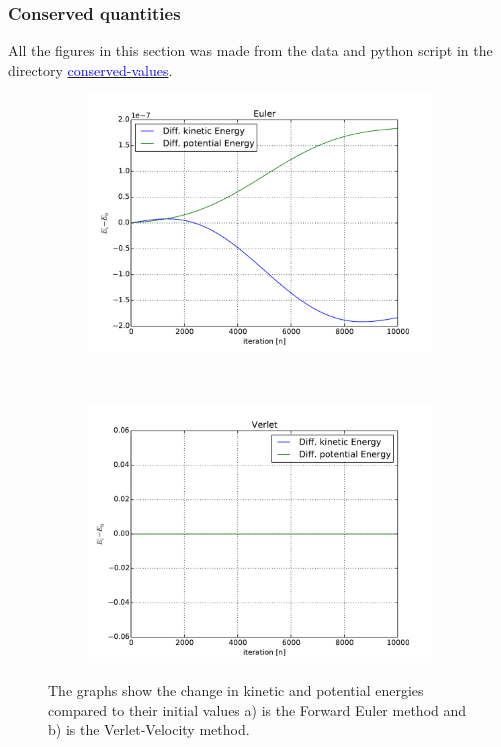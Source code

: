 \subsubsection{Conserved quantities}

All the figures in this section was made from the data and python script in the directory \href{https://github.com/erikfsk/Project-3/tree/master/Project3/conserved-values}{\textcolor{blue}{conserved-values}}.

\begin{figure}[H]
    \centering
    \begin{subfigure}{0.5\textwidth}
        \centering
        \includegraphics[width=\linewidth]{result/bilder/kin-pot-euler.pdf}
    	\caption{}
    \end{subfigure}%
    ~ 
    \begin{subfigure}{0.5\textwidth}
        \centering
        \includegraphics[width=\linewidth]{result/bilder/kin-pot-verlet.pdf}
        \caption{}
    \end{subfigure}
    \caption{The graphs show the change in kinetic and potential energies compared to their initial values a) is the Forward Euler method and b) is the Verlet-Velocity method.}
    \label{fig:conserved-energy}
\end{figure}

